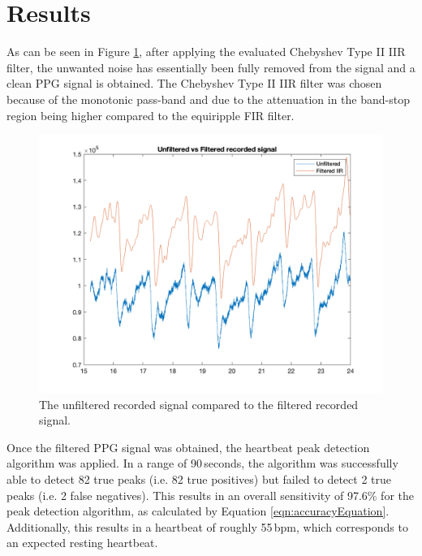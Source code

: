 
\section{Results}
As can be seen in Figure \ref{fig:filtvsunfilt}, after applying the evaluated Chebyshev Type II IIR filter, the unwanted noise has essentially been fully removed from the signal and a clean PPG signal is obtained. The Chebyshev Type II IIR filter was chosen because of the monotonic pass-band and due to the attenuation in the band-stop region being higher compared to the equiripple FIR filter.

\begin{figure}[H]
	\centering
	\includegraphics[width=\linewidth, trim={2.5cm, 1cm, 2cm, 1cm}, clip]{Figures/filteredvsunfiltered.png}
	\caption{The unfiltered recorded signal compared to the filtered recorded signal.}
	\label{fig:filtvsunfilt}
\end{figure}

Once the filtered PPG signal was obtained, the heartbeat peak detection algorithm was applied. In a range of 90\,seconds, the algorithm was successfully able to detect 82 true peaks (i.e. 82 true positives) but failed to detect 2 true peaks (i.e. 2 false negatives). This results in an overall sensitivity of 97.6\% for the peak detection algorithm, as calculated by Equation \eqref{eqn:accuracyEquation}. Additionally, this results in a heartbeat of roughly 55\,bpm, which corresponds to an expected resting heartbeat.


